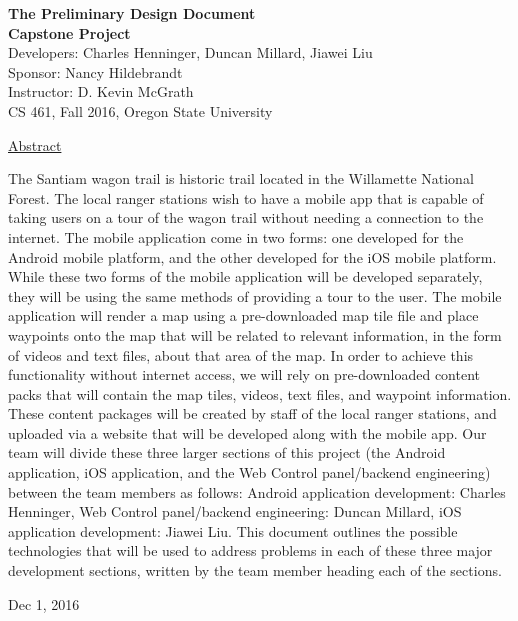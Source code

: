 \documentclass[letterpaper, 10pt,titlepage]{article}
\newcommand\tab[1][1cm]{\hspace*{#1}}
\begin{document}
\begin{titlepage}
\begin{center}
    \Huge
    \textbf{The Preliminary Design Document}\\
    \textbf{Capstone Project}\\
    \vspace{1.0cm}
    \large
    Developers: Charles Henninger, Duncan Millard, Jiawei Liu\\
    Sponsor: Nancy Hildebrandt\\
    \vspace{1.5cm}
    \large
    Instructor: D. Kevin McGrath\\

    \large
    CS 461, Fall 2016, Oregon State University\\    

    \vspace{3.2cm}

    \large
    \underline{Abstract}\\
    \vspace{0.3cm}
    \end{center}
    \large

    \tab The Santiam wagon trail is historic trail located in the Willamette National Forest. The local ranger stations wish to have a mobile app that is capable of taking users on a tour of the wagon trail without needing a connection to the internet. The mobile application come in two forms: one developed for the Android mobile platform, and the other developed for the iOS mobile platform. While these two forms of the mobile application will be developed separately, they will be using the same methods of providing a tour to the user. The mobile application will render a map using a pre-downloaded map tile file and place waypoints onto the map that will be related to relevant information, in the form of videos and text files, about that area of the map. In order to achieve this functionality without internet access, we will rely on pre-downloaded content packs that will contain the map tiles, videos, text files, and waypoint information. These content packages will be created by staff of the local ranger stations, and uploaded via a website that will be developed along with the mobile app. Our team will divide these three larger sections of this project (the Android application, iOS application, and the Web Control panel/backend engineering) between the team members as follows: Android application development: Charles Henninger, Web Control panel/backend engineering: Duncan Millard, iOS application development: Jiawei Liu. This document outlines the possible technologies that will be used to address problems in each of these three major development sections, written by the team member heading each of the sections.
    
    \vspace{0.8cm}
    \vfill
    
\begin{center}    
    Dec 1, 2016

\end{center}
\end{titlepage}
\end{document}
